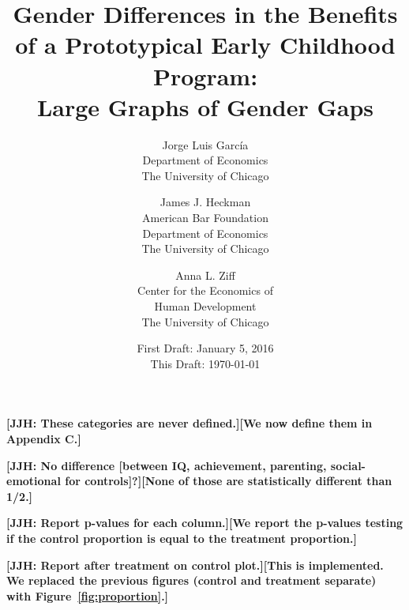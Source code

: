 


\usepackage[stable]{footmisc}

\newcommand*\leftright[2]{%
  \leavevmode
  \rlap{#1}%
  \hspace{0.5\linewidth}%
  #2}

\newcommand{\orth}{\ensuremath{\perp\!\!\!\perp}}%
\newcommand{\indep}{\orth}%
\newcommand{\notorth}{\ensuremath{\perp\!\!\!\!\!\!\diagup\!\!\!\!\!\!\perp}}%
\newcommand{\notindep}{\notorth}




\begin{titlepage}

\title{\Large \textbf{Gender Differences in the Benefits of a Prototypical Early Childhood Program: \\ Large Graphs of Gender Gaps}}

\author{
Jorge Luis Garc\'{i}a\\
Department of Economics\\
The University of Chicago \and
James J. Heckman \\
American Bar Foundation \\
Department of Economics\\
The University of Chicago \and
Anna L. Ziff \\
Center for the Economics of \\
Human Development \\
The University of Chicago}
\date{First Draft: January 5, 2016\\ This Draft: \today}

\maketitle
\restoregeometry
\end{titlepage}

\textbf{[JJH: These categories are never defined.][We now define them in Appendix C.]}


\textbf{[JJH: No difference [between IQ, achievement, parenting, social-emotional for controls]?][None of those are statistically different than 1/2.]}

\textbf{[JJH: Report p-values for each column.][We report the p-values testing if the control proportion is equal to the treatment proportion.]}

\textbf{[JJH: Report after treatment on control plot.][This is implemented. We replaced the previous figures (control and treatment separate) with Figure~\ref{fig:proportion}.]}

